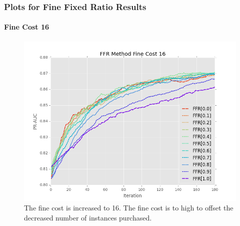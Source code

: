 \documentclass{beamer}
\begin{document}
\begin{frame}
    \frametitle{Plots for Fine Fixed Ratio Results}
    \framesubtitle{Fine Cost 16}
    \begin{figure}[!htb]
        \centering
        \includegraphics[width=0.8\columnwidth]{fig/ParamsFFR_PR_Cost16_rnds0_180}
        \caption{The fine cost is increased to 16. The fine cost is to high to offset the decreased number of instances purchased.}
        \label{fig:ParamsFFR_PR_Cost16_rnds0_180}
    \end{figure}
\end{frame}
\end{document}
